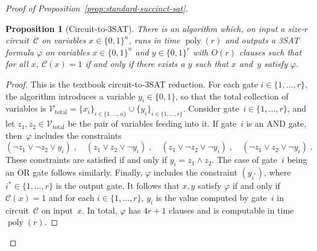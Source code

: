 \documentclass[11pt]{article}
\newtheorem{proposition}[theorem]{Proposition}
\theoremstyle{definition}
\DeclareMathOperator{\poly}{poly}
\newcommand{\circuit}{\mathcal{C}}
\begin{document}
\begin{proof}[Proof of Proposition~\ref{prop:standard-succinct-sat}]
\begin{proposition}[Circuit-to-3SAT]\label{prop:circuit-to-sat-reduction}
  There is an algorithm which, on input a size-$r$ circuit~$\circuit$ on
  variables $x \in \{0, 1\}^n$, runs in time $\poly(r)$ and outputs a 3SAT
  formula $\varphi$ on variables $x \in \{0, 1\}^n$ and $y \in \{0, 1\}^r$ with
  $O(r)$ clauses such that for all $x$, $\circuit(x) = 1$ if and only if there
  exists a $y$ such that $x$ and~$y$ satisfy $\varphi$.
\end{proposition}
\begin{proof}
  This is the textbook circuit-to-3SAT reduction.
  For each gate $i \in \{1, \ldots, r\}$, the algorithm introduces a variable
  $y_i \in \{0, 1\}$, so that the total collection of variables is
  $\mathcal{V}_{\mathrm{total}} = \{x_i\}_{i \in \{1, \ldots, n\}} \cup
  \{y_i\}_{i \in \{1, \ldots, r\}}$.
  Consider gate~$i \in \{1, \ldots, r\}$, and let $z_1, z_2 \in
  \mathcal{V}_{\mathrm{total}}$ be the pair of variables feeding into it.
  If gate~$i$ is an AND gate, then~$\varphi$ includes the constraints
  \begin{equation}\label{eq:AND-gate}
    (\neg z_1 \lor \neg z_2 \lor y_i)\;,
    \quad
    (z_1 \lor  z_2 \lor \neg y_i)\;,
    \quad
    (z_1 \lor  \neg z_2 \lor \neg y_i)\;,
    \quad
    (\neg z_1 \lor  z_2 \lor \neg y_i)\;.
  \end{equation}
  These constraints are satisfied if and only if $y_i = z_1 \land z_2$.
  The case of gate~$i$ being an OR gate follows similarly.
  Finally, $\varphi$ includes the constraint $(y_{i^*})$, where $i^* \in \{1,
  \ldots, r\}$ is the output gate.
  It follows that $x, y$ satisfy $\varphi$ if and only if $\circuit(x) = 1$ and
  for each $i \in \{1, \ldots, r\}$, $y_i$ is the value computed by gate~$i$ in
  circuit~$\circuit$ on input~$x$.
  In total, $\varphi$ has $4r+1$ clauses and is computable in time $\poly(r)$.
\end{proof}


\end{proof}
\end{document}
